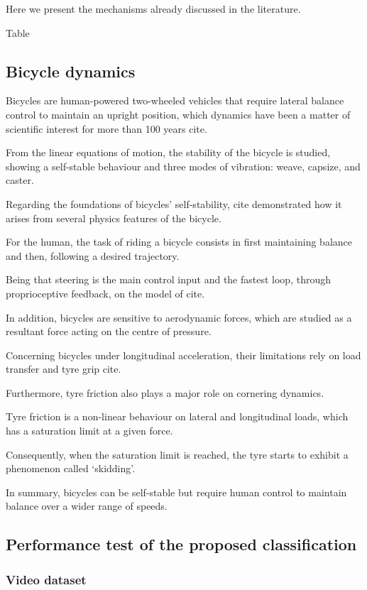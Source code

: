 \documentclass{article}
\begin{document}
Here we present the mechanisms already discussed in the literature.

Table

\subsection{Bicycle dynamics}

Bicycles are human-powered two-wheeled vehicles that require lateral balance control to maintain an upright position, which dynamics have been a matter of scientific interest for more than 100 years cite{}.

From the linear equations of motion, the stability of the bicycle is studied, showing a self-stable behaviour and three modes of vibration: weave, capsize, and caster.

Regarding the foundations of bicycles’ self-stability, cite{} demonstrated how it arises from several physics features of the bicycle.

For the human, the task of riding a bicycle consists in first maintaining balance and then, following a desired trajectory. 

Being that steering is the main control input and the fastest loop, through proprioceptive feedback, on the model of cite{}.

In addition, bicycles are sensitive to aerodynamic forces, which are studied as a resultant force acting on the centre of pressure.

Concerning bicycles under longitudinal acceleration, their limitations rely on load transfer and tyre grip cite{}.

Furthermore, tyre friction also plays a major role on cornering dynamics.

Tyre friction is a non-linear behaviour on lateral and longitudinal loads, which has a saturation limit at a given force.

Consequently, when the saturation limit is reached, the tyre starts to exhibit a phenomenon called ‘skidding’.

In summary, bicycles can be self-stable but require human control to maintain balance over a wider range of speeds. 


\subsection{Performance test of the proposed classification}

\subsubsection{Video dataset}
\end{document}

